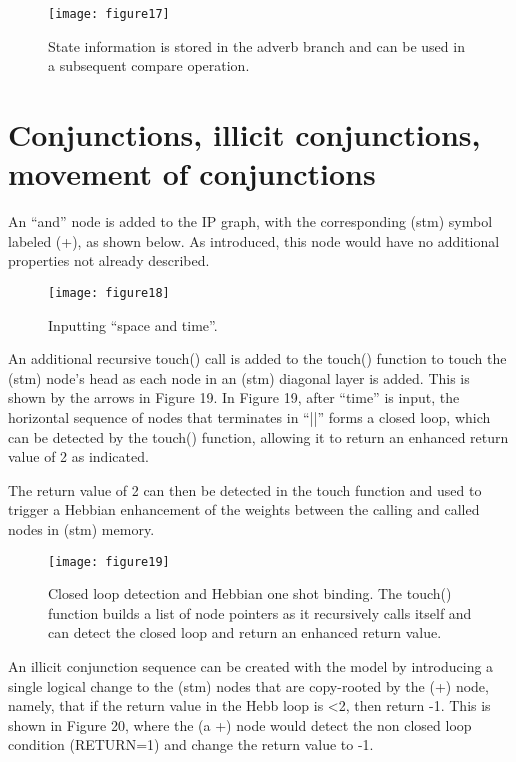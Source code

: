 \documentclass{clv3}
\begin{document}
\begin{figure}[H]
\texttt{[image: figure17]}
\caption{State information is stored in the adverb branch and can be used in a subsequent compare operation. }
\end{figure}




\section{Conjunctions, illicit conjunctions, movement of conjunctions}              


An ``and'' node is added to the IP graph, with the corresponding (stm) symbol labeled (+), as shown below.   As introduced, this node would have no additional properties not already described.

\begin{figure}[H]
\texttt{[image: figure18]}
\caption{Inputting ``space and time''. }
\end{figure}


An additional recursive touch() call is added to the touch() function to touch the (stm) node's head as each node in an (stm) diagonal layer is added.
This is shown by the arrows in Figure 19.   
In Figure 19, after ``time'' is input, the horizontal sequence of nodes that terminates in ``||''  forms a closed loop, which can be detected by the touch() function, allowing it to return an enhanced return  value of 2 as indicated.   


The return value of 2 can then be detected in the touch function and used to trigger a Hebbian enhancement of the weights between the calling and called nodes in (stm) memory. 



\begin{figure}[H]
\texttt{[image: figure19]}
\caption{Closed loop detection and Hebbian one shot binding.  The touch()  function builds a list of node pointers as it recursively calls itself and can detect the closed loop and return an enhanced return value.}
\end{figure}

An illicit conjunction sequence can be created with the model by introducing a single logical change to the (stm) nodes that are copy-rooted by the (+) node, namely, that if the return value in the Hebb loop is <2, then return -1.   This is shown in Figure 20, where the (a +) node would detect the non closed loop condition (RETURN=1) and change the return value to -1. 
\end{document}
